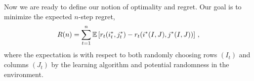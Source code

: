 
Now we are ready to define our notion of optimality and regret.  Our goal is to minimize the expected $n$-step regret,
\begin{align}
  R(n) =
  \sum_{t = 1}^n \mathbb{E}\left[r_t(i^\ast_t, j^\ast_t) - r_t(i^\ast(I,J),j^\ast(I,J))\right]\,,
  \label{eq:regret1}
\end{align}
where the expectation is with respect to both randomly choosing rows $(I_t)$ and columns $(J_t)$ by the learning algorithm and potential randomness in the environment.


